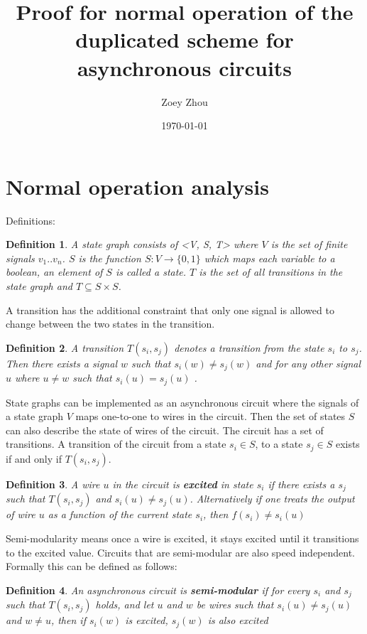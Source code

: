 \documentclass{article}
\title{Proof for normal operation of the duplicated scheme for asynchronous circuits}
\author{Zoey Zhou}
\date{\today}
\newtheorem*{definition}{Definition}
\begin{document}
\section{Normal operation analysis}
Definitions:  
\begin{definition}A state graph consists of <V, S, T> where $V$ is the set of finite signals $v_1 .. v_n$.  $S$ is the function $S: V \to \{0,1\}$ %
which maps each variable to a boolean, an element of $S$ is called a state. $T$ is the set of all transitions in the state graph and $T \subseteq S \times S$.  \end{definition}

A transition has the additional constraint that only one signal is allowed to change between the two states in the transition.
\begin{definition}A transition $T(s_i, s_j)$ denotes a transition from the state $s_i$ to $s_j$.  Then there exists a signal $w$ such that $s_i(w)\neq s_j(w)$ and for any other signal $u$ where $u \neq w$ such that $s_i(u)=s_j(u)$ . 
\end{definition}

State graphs can be implemented as an asynchronous circuit where the signals of a state graph $V$ maps one-to-one to wires in the circuit. %
Then the set of states $S$ can also describe the state of wires of the circuit.  The circuit has a set of transitions.  A transition of the circuit from a state $s_i \in S$, to a state $s_j \in S$ exists if and only if $T(s_i, s_j)$.%
\begin{definition}A wire $u$ in the circuit is \textbf{excited} in state $s_i$ if there exists a $s_j$ such that $T(s_i,s_j)$ and $s_i(u) \neq s_j(u)$.  Alternatively if one treats the output of wire $u$ as a function of the current state $s_i$, then $f(s_i)\neq s_i(u)$\end{definition}

Semi-modularity means once a wire is excited, it stays excited until it transitions to the excited value.  Circuits that are semi-modular are also speed independent.  Formally this can be defined as follows:
\begin{definition}An asynchronous circuit is \textbf{semi-modular} if for every $s_i$ and $s_j$ such that $T(s_i,s_j)$ holds, and let $u$ and $w$ be wires such that $s_i(u) \neq s_j(u)$ and $w\neq u$, then if $s_i(w)$ is excited, $s_j(w)$ is also excited \end{definition}
\end{document}
